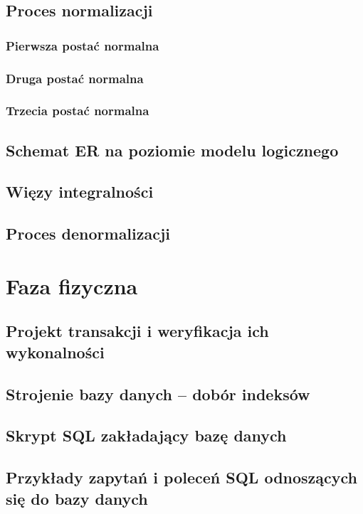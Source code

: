 \documentclass{mwrep}[15pt]
\begin{document}
\newpage
\section{Proces normalizacji}

\subsection{Pierwsza postać normalna}
\subsection{Druga postać normalna}
\subsection{Trzecia postać normalna}


\section{Schemat ER na poziomie modelu logicznego}

\section{Więzy integralności}

\section{Proces denormalizacji}

\chapter{Faza fizyczna}

\section{Projekt transakcji i weryfikacja ich wykonalności}

\section{Strojenie bazy danych – dobór indeksów}

\section{Skrypt SQL zakładający bazę danych}

\section{Przykłady zapytań i poleceń SQL odnoszących się do bazy danych}
\end{document}
